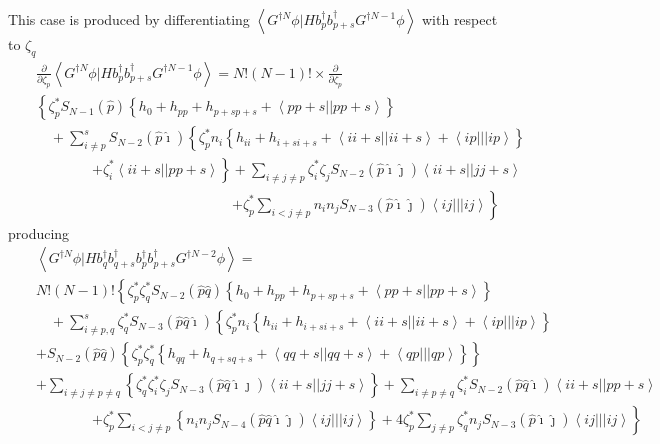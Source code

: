 This case is produced by differentiating $\left\langle G^{\dagger N}\phi
|Hb_{p}^{\dagger }b_{p+s}^{\dagger }G^{\dagger N-1}\phi \right\rangle $ with
respect to $\zeta _{q}$ 
\begin{eqnarray}
&&\frac{\partial }{\partial \zeta _{p}}\left\langle G^{\dagger N}\phi
|Hb_{p}^{\dagger }b_{p+s}^{\dagger }G^{\dagger N-1}\phi \right\rangle
=N!\left( N-1\right) !\times \frac{\partial }{\partial \zeta _{p}}  \nonumber
\\
&&\left\{ \zeta _{p}^{\ast }S_{N-1}\left( \hat{p}\right) \left\{
h_{0}+h_{pp}+h_{p+sp+s}+\left\langle pp+s||pp+s\right\rangle \right\} \right.
\nonumber \\
&&\left. {}\right. \quad +\sum_{i\neq p}^{s}S_{N-2}\left( \hat{p}\hat{\imath}%
\right) \left\{ \zeta _{p}^{\ast }n_{i}\left\{
h_{ii}+h_{i+si+s}+\left\langle ii+s||ii+s\right\rangle +\left\langle
ip|||ip\right\rangle \right\} \right.  \nonumber \\
&&\qquad \qquad \left. +\zeta _{i}^{\ast }\left\langle
ii+s||pp+s\right\rangle \right\} +\sum_{i\neq j\neq p}\zeta _{i}^{\ast
}\zeta _{j}S_{N-2}\left( \hat{p}\hat{\imath}\hat{\jmath}\right) \left\langle
ii+s||jj+s\right\rangle  \nonumber \\
&&\qquad \qquad \qquad \qquad \qquad \qquad \qquad \left. +\zeta _{p}^{\ast
}\sum_{i<j\neq p}n_{i}n_{j}S_{N-3}\left( \hat{p}\hat{\imath}\hat{\jmath}%
\right) \left\langle ij|||ij\right\rangle \right\}
\end{eqnarray}%
producing 
\begin{eqnarray}
&&\left\langle G^{\dagger N}\phi |Hb_{q}^{\dagger }b_{q+s}^{\dagger
}b_{p}^{\dagger }b_{p+s}^{\dagger }G^{\dagger N-2}\phi \right\rangle = 
\nonumber \\
&&N!\left( N-1\right) !\left\{ \zeta _{p}^{\ast }\zeta _{q}^{\ast
}S_{N-2}\left( \hat{p}\hat{q}\right) \left\{
h_{0}+h_{pp}+h_{p+sp+s}+\left\langle pp+s||pp+s\right\rangle \right\} \right.
\nonumber \\
&&\left. {}\right. \quad +\sum_{i\neq p,q}^{s}\zeta _{q}^{\ast
}S_{N-3}\left( \hat{p}\hat{q}\hat{\imath}\right) \left\{ \zeta _{p}^{\ast
}n_{i}\left\{ h_{ii}+h_{i+si+s}+\left\langle ii+s||ii+s\right\rangle
+\left\langle ip|||ip\right\rangle \right\} \right.  \nonumber \\
&&+S_{N-2}\left( \hat{p}\hat{q}\right) \left\{ \zeta _{p}^{\ast }\zeta
_{q}^{\ast }\left\{ h_{qq}+h_{q+sq+s}+\left\langle qq+s||qq+s\right\rangle
+\left\langle qp|||qp\right\rangle \right\} \right\}  \nonumber \\
&&+\sum_{i\neq j\neq p\neq q}\left\{ \zeta _{q}^{\ast }\zeta _{i}^{\ast
}\zeta _{j}S_{N-3}\left( \hat{p}\hat{q}\hat{\imath}\hat{\jmath}\right)
\left\langle ii+s||jj+s\right\rangle \right\} +\sum_{i\neq p\neq q}\zeta
_{i}^{\ast }S_{N-2}\left( \hat{p}\hat{q}\hat{\imath}\right) \left\langle
ii+s||pp+s\right\rangle  \nonumber \\
&&\qquad \qquad \left. +\zeta _{p}^{\ast }\sum_{i<j\neq p}\left\{
n_{i}n_{j}S_{N-4}\left( \hat{p}\hat{q}\hat{\imath}\hat{\jmath}\right)
\left\langle ij|||ij\right\rangle \right\} +4\zeta _{p}^{\ast }\sum_{j\neq
p}\zeta _{q}^{\ast }n_{j}S_{N-3}\left( \hat{p}\hat{\imath}\hat{\jmath}%
\right) \left\langle ij|||ij\right\rangle \right\}
\end{eqnarray}


